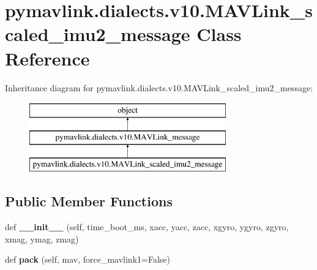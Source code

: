 \hypertarget{classpymavlink_1_1dialects_1_1v10_1_1MAVLink__scaled__imu2__message}{}\section{pymavlink.\+dialects.\+v10.\+M\+A\+V\+Link\+\_\+scaled\+\_\+imu2\+\_\+message Class Reference}
\label{classpymavlink_1_1dialects_1_1v10_1_1MAVLink__scaled__imu2__message}
Inheritance diagram for pymavlink.\+dialects.\+v10.\+M\+A\+V\+Link\+\_\+scaled\+\_\+imu2\+\_\+message\+:\begin{figure}[H]
\begin{center}
\leavevmode
\includegraphics[height=3.000000cm]{classpymavlink_1_1dialects_1_1v10_1_1MAVLink__scaled__imu2__message}
\end{center}
\end{figure}
\subsection*{Public Member Functions}
\begin{DoxyCompactItemize}
\item 
\mbox{\label{classpymavlink_1_1dialects_1_1v10_1_1MAVLink__scaled__imu2__message_aa91a6b387cc9d42a24e1eba2f110586e}} 
def {\bfseries \+\_\+\+\_\+init\+\_\+\+\_\+} (self, time\+\_\+boot\+\_\+ms, xacc, yacc, zacc, xgyro, ygyro, zgyro, xmag, ymag, zmag)
\item 
\mbox{\label{classpymavlink_1_1dialects_1_1v10_1_1MAVLink__scaled__imu2__message_a4309a8f0b160f55acaf2aae4be63d684}} 
def {\bfseries pack} (self, mav, force\+\_\+mavlink1=False)
\end{DoxyCompactItemize}
